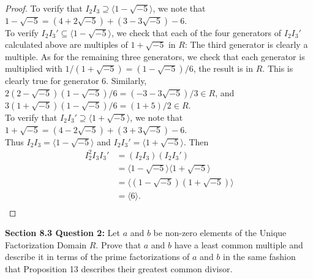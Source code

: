 \documentclass{article}
\begin{document}
\begin{enumerate}[label={\bf(\alph*)}]
\begin{proof}
        To verify that $I_2I_3\supseteq\langle1-\sqrt{-5}\rangle$, we note
        that $1-\sqrt{-5}=(4+2\sqrt{-5})+(3-3\sqrt{-5})-6$. \\

        To verify $I_2I_3'\subseteq\langle1-\sqrt{-5}\rangle$, we check that
        each of the four generators of $I_2I_3'$ calculated above are
        multiples of $1+\sqrt{-5}$ in $R$: The third generator is clearly a
        multiple. As for the remaining three generators, we check that each
        generator is multiplied with $1/(1+\sqrt{-5})=(1-\sqrt{-5})/6$, the
        result is in $R$. This is clearly true for generator 6. Similarly,
        $2(2-\sqrt{-5})(1-\sqrt{-5})/6=(-3-3\sqrt{-5})/3\in R$, and
        $3(1+\sqrt{-5})(1-\sqrt{-5})/6=(1+5)/2\in R$. \\

        To verify that $I_2I_3'\supseteq\langle1+\sqrt{-5}\rangle$, we note
        that $1+\sqrt{-5}=(4-2\sqrt{-5})+(3+3\sqrt{-5})-6$. \\

        Thus $I_2I_3=\langle1-\sqrt{-5}\rangle$ and
        $I_2I_3'=\langle1+\sqrt{-5}\rangle$. Then
        \begin{align*}
          I_2^2I_3I_3' &=(I_2I_3)(I_2I_3') \\
            &=\langle1-\sqrt{-5}\rangle \langle1+\sqrt{-5}\rangle \\
            &=\langle(1-\sqrt{-5})(1+\sqrt{-5})\rangle \\
            &=\langle6\rangle. \\
        \end{align*}
      \end{proof}
  \end{enumerate}

\textbf{Section 8.3 Question 2:} Let $a$ and $b$ be non-zero elements of
  the Unique Factorization Domain $R$. Prove that $a$ and $b$ have a least
  common multiple and describe it in terms of the prime factorizations of
  $a$ and $b$ in the same fashion that Proposition 13 describes their
  greatest common divisor.
\end{document}
